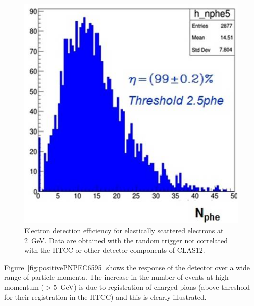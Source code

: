 \begin{figure}[!ht]
    \centering
    \includegraphics[width=1.0\linewidth,trim={0.0cm 0.0cm 0.0cm 0.0cm},clip]{images/RAFO_2GeV.jpg}
    \caption{Electron detection efficiency for elastically scattered electrons at 2~GeV. Data are obtained with the
      random trigger not correlated with the HTCC or other detector components of CLAS12.}
    \label{fig:RAFO_2GeV}
\end{figure}

Figure~\ref{fig:positivePNPEC6595} shows the response of the detector over a wide range of particle momenta.
The increase in the number of events at high momentum ($>$5~GeV) is due to registration of charged pions (above
threshold for their registration in the HTCC) and this is clearly illustrated.

